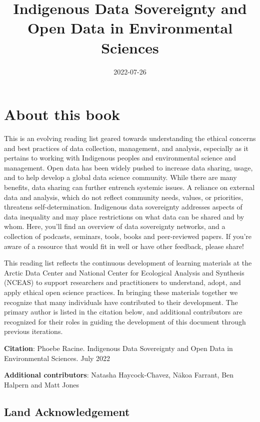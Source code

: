 \documentclass[
  11pt,
  paperpaper,
  openany]{book}
\title{Indigenous Data Sovereignty and Open Data in Environmental Sciences}
\author{}
\date{\vspace{-2.5em}2022-07-26}
\begin{document}
\maketitle

{
\setcounter{tocdepth}{1}
\tableofcontents
}
\hypertarget{about-this-book}{%
\chapter*{About this book}\label{about-this-book}}

This is an evolving reading list geared towards understanding the ethical concerns and best practices of data collection, management, and analysis, especially as it pertains to working with Indigenous peoples and environmental science and management. Open data has been widely pushed to increase data sharing, usage, and to help develop a global data science community. While there are many benefits, data sharing can further entrench systemic issues. A reliance on external data and analysis, which do not reflect community needs, values, or priorities, threatens self-determination. Indigenous data sovereignty addresses aspects of data inequality and may place restrictions on what data can be shared and by whom. Here, you'll find an overview of data sovereignty networks, and a collection of podcasts, seminars, tools, books and peer-reviewed papers. If you're aware of a resource that would fit in well or have other feedback, please share!

This reading list reflects the continuous development of learning materials at the Arctic Data Center and National Center for Ecological Analysis and Synthesis (NCEAS) to support researchers and practitioners to understand, adopt, and apply ethical open science practices. In bringing these materials together we recognize that many individuals have contributed to their development. The primary author is listed in the citation below, and additional contributors are recognized for their roles in guiding the development of this document through previous iterations.

\textbf{Citation}: Phoebe Racine. Indigenous Data Sovereignty and Open Data in Environmental Sciences. July 2022

\textbf{Additional contributors}: Natasha Haycock-Chavez, Nākoa Farrant, Ben Halpern and Matt Jones

\hypertarget{land-acknowledgement}{%
\section*{Land Acknowledgement}\label{land-acknowledgement}}
\end{document}
